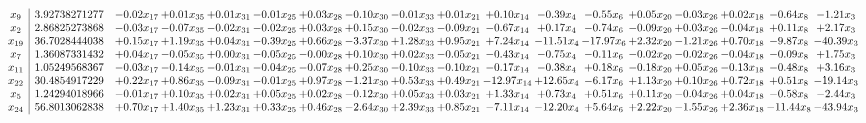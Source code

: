 \documentclass[9pt]{article}
\begin{document}
 \[\begin{array}{c| c c@{\hskip 2pt} c@{\hskip 2pt} c@{\hskip 2pt} c@{\hskip 2pt} c@{\hskip 2pt} c@{\hskip 2pt} c@{\hskip 2pt} c@{\hskip 2pt} c@{\hskip 2pt} c@{\hskip 2pt} c@{\hskip 2pt} c@{\hskip 2pt} c@{\hskip 2pt} c@{\hskip 2pt} c@{\hskip 2pt} c@{\hskip 2pt} }
 x_{9}   &  3.92738271277 & -0.02 x_{17} & +  0.01 x_{35} & +  0.01 x_{31} & -0.01 x_{25} & +  0.03 x_{28} & -0.10 x_{30} & -0.01 x_{33} & +  0.01 x_{21} & +  0.10 x_{14} & -0.39 x_{4} & -0.55 x_{6} & +  0.05 x_{20} & -0.03 x_{26} & +  0.02 x_{18} & -0.64 x_{8} & -1.21 x_{3}\\
 x_{2}   &  2.86825273868 & -0.03 x_{17} & -0.07 x_{35} & -0.02 x_{31} & -0.02 x_{25} & +  0.03 x_{28} & +  0.15 x_{30} & -0.02 x_{33} & -0.09 x_{21} & -0.67 x_{14} & +  0.17 x_{4} & -0.74 x_{6} & -0.09 x_{20} & +  0.03 x_{26} & -0.04 x_{18} & +  0.11 x_{8} & +  2.17 x_{3}\\
 x_{19}   &  36.7028444038 & +  0.15 x_{17} & +  1.19 x_{35} & +  0.04 x_{31} & -0.39 x_{25} & +  0.66 x_{28} & -3.37 x_{30} & +  1.28 x_{33} & +  0.95 x_{21} & +  7.24 x_{14} & -11.51 x_{4} & -17.97 x_{6} & +  2.32 x_{20} & -1.21 x_{26} & +  0.70 x_{18} & -9.87 x_{8} & -40.39 x_{3}\\
 x_{7}   &  1.36087331432 & +  0.04 x_{17} & -0.05 x_{35} & +  0.00 x_{31} & -0.05 x_{25} & -0.00 x_{28} & +  0.10 x_{30} & +  0.02 x_{33} & -0.05 x_{21} & -0.43 x_{14} & -0.75 x_{4} & -0.11 x_{6} & -0.02 x_{20} & -0.02 x_{26} & -0.04 x_{18} & -0.09 x_{8} & +  1.75 x_{3}\\
 x_{11}   &  1.05249568367 & -0.03 x_{17} & -0.14 x_{35} & -0.01 x_{31} & -0.04 x_{25} & -0.07 x_{28} & +  0.25 x_{30} & -0.10 x_{33} & -0.10 x_{21} & -0.17 x_{14} & -0.38 x_{4} & +  0.18 x_{6} & -0.18 x_{20} & +  0.05 x_{26} & -0.13 x_{18} & -0.48 x_{8} & +  3.16 x_{3}\\
 x_{22}   &  30.4854917229 & +  0.22 x_{17} & +  0.86 x_{35} & -0.09 x_{31} & -0.01 x_{25} & +  0.97 x_{28} & -1.21 x_{30} & +  0.53 x_{33} & +  0.49 x_{21} & -12.97 x_{14} & + 12.65 x_{4} & -6.17 x_{6} & +  1.13 x_{20} & +  0.10 x_{26} & +  0.72 x_{18} & +  0.51 x_{8} & -19.14 x_{3}\\
 x_{5}   &  1.24294018966 & -0.01 x_{17} & +  0.10 x_{35} & +  0.02 x_{31} & +  0.05 x_{25} & +  0.02 x_{28} & -0.12 x_{30} & +  0.05 x_{33} & +  0.03 x_{21} & +  1.33 x_{14} & +  0.73 x_{4} & +  0.51 x_{6} & +  0.11 x_{20} & -0.04 x_{26} & +  0.04 x_{18} & -0.58 x_{8} & -2.44 x_{3}\\
 x_{24}   &  56.8013062838 & +  0.70 x_{17} & +  1.40 x_{35} & +  1.23 x_{31} & +  0.33 x_{25} & +  0.46 x_{28} & -2.64 x_{30} & +  2.39 x_{33} & +  0.85 x_{21} & -7.11 x_{14} & -12.20 x_{4} & +  5.64 x_{6} & +  2.22 x_{20} & -1.55 x_{26} & +  2.36 x_{18} & -11.44 x_{8} & -43.94 x_{3}\\

\end{array}\]
\end{document}
